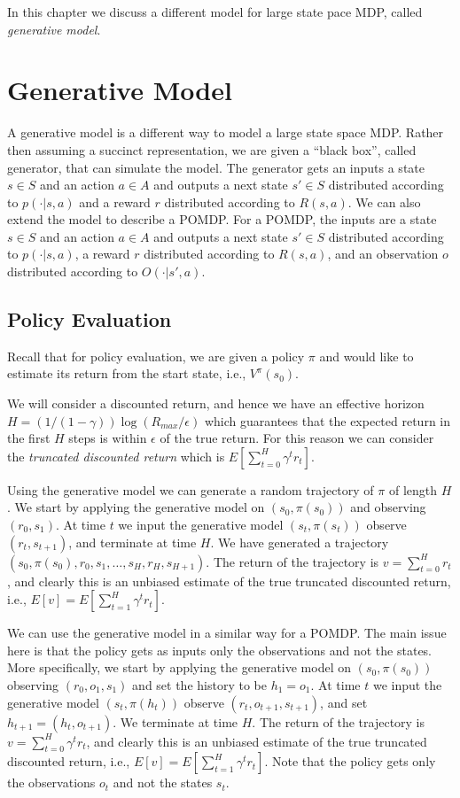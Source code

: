 

In this chapter we discuss a
different model for large state pace MDP, called {\em generative
model}. 

\section{Generative Model}

A generative model is a different way to model a large state space
MDP. Rather then assuming a succinct representation, we are given a
``black box'', called generator, that can simulate the model. The
generator gets an inputs a state $s\in S$ and an action $a\in A$ and
outputs a next state $s'\in S$ distributed according to $p(\cdot
|s,a)$ and a reward $r$ distributed according to $R(s,a)$. We can
also extend the model to describe a POMDP. For a POMDP, the inputs
are a state $s\in S$ and an action $a\in A$ and outputs a next state
$s'\in S$ distributed according to $p(\cdot |s,a)$, a reward $r$
distributed according to $R(s,a)$, and an observation $o$
distributed according to $O(\cdot|s',a)$.

\subsection{Policy Evaluation}

Recall that for policy evaluation, we are given a policy $\pi$ and
would like to estimate its return from the start state, i.e.,
$V^\pi(s_0)$.

We will consider a discounted return, and hence we have an effective
horizon $H=(1/(1-\gamma))\log (R_{max}/\epsilon)$ which guarantees
that the expected return in the first $H$ steps is within $\epsilon$
of the true return. For this reason we can consider the {\em
truncated discounted return} which is $E[\sum_{t=0}^H \gamma^t
r_t]$.

Using the generative model we can generate a random trajectory of
$\pi$ of length $H$. We start by applying the generative model on
$(s_0, \pi(s_0))$ and observing $(r_0,s_1)$. At time $t$ we input
the generative model $(s_t,\pi(s_t))$  observe $(r_t,s_{t+1})$, and
terminate at time $H$. We have generated a trajectory
$(s_0,\pi(s_0), r_0, s_1, \ldots, s_H,r_H,s_{H+1})$. The return of
the trajectory is $v=\sum_{t=0}^H r_t$, and clearly this is an
unbiased estimate of the true truncated discounted return, i.e.,
$E[v]=E[\sum_{t=1}^H \gamma^t r_t]$.


We can use the generative model in a similar way for a POMDP. The
main issue here is that the policy gets as inputs only the
observations and not the states. More specifically, we start by
applying the generative model on $(s_0, \pi(s_0))$  observing
$(r_0,o_1,s_1)$ and set the history to be $h_1=o_1$. At time $t$ we
input the generative model $(s_t,\pi(h_t))$  observe
$(r_t,o_{t+1},s_{t+1})$, and set $h_{t+1}=(h_t,o_{t+1})$. We
terminate at time $H$. The return of the trajectory is
$v=\sum_{t=0}^H \gamma^t r_t$, and clearly this is an unbiased
estimate of the true truncated discounted return, i.e.,
$E[v]=E[\sum_{t=1}^H \gamma^t r_t]$. Note that the policy gets only
the observations $o_t$ and not the states $s_t$.

